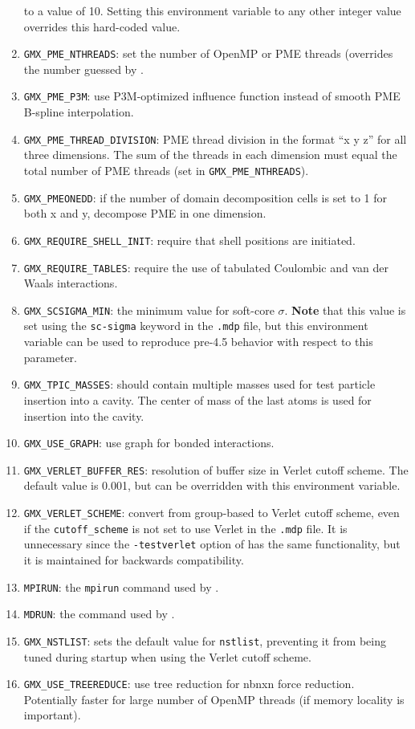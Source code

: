 \begin{enumerate}
        to a value of 10. Setting this environment variable to any other integer value overrides this hard-coded
        value.
\item   {\tt GMX_PME_NTHREADS}: set the number of OpenMP or PME threads (overrides the number guessed by 
        {\tt {}}.
\item   {\tt GMX_PME_P3M}: use P3M-optimized influence function instead of smooth PME B-spline interpolation.
\item   {\tt GMX_PME_THREAD_DIVISION}: PME thread division in the format ``x y z'' for all three dimensions. The
        sum of the threads in each dimension must equal the total number of PME threads (set in 
        {\tt GMX_PME_NTHREADS}).
\item   {\tt GMX_PMEONEDD}: if the number of domain decomposition cells is set to 1 for both x and y, 
        decompose PME in one dimension.
\item   {\tt GMX_REQUIRE_SHELL_INIT}: require that shell positions are initiated.
\item   {\tt GMX_REQUIRE_TABLES}: require the use of tabulated Coulombic
        and van der Waals interactions.
\item   {\tt GMX_SCSIGMA_MIN}: the minimum value for soft-core $\sigma$. {\bf Note} that this value is set
        using the {\tt sc-sigma} keyword in the {\tt .mdp} file, but this environment variable can be used
        to reproduce pre-4.5 behavior with respect to this parameter.
\item   {\tt GMX_TPIC_MASSES}: should contain multiple masses used for test particle insertion into a cavity.
        The center of mass of the last atoms is used for insertion into the cavity.
\item   {\tt GMX_USE_GRAPH}: use graph for bonded interactions.
\item   {\tt GMX_VERLET_BUFFER_RES}: resolution of buffer size in Verlet cutoff scheme.  The default value is
        0.001, but can be overridden with this environment variable.
\item   {\tt GMX_VERLET_SCHEME}: convert from group-based to Verlet cutoff scheme, even if the {\tt cutoff_scheme} is
        not set to use Verlet in the {\tt .mdp} file. It is unnecessary since the {\tt -testverlet} option of
        {\tt {}} has the same functionality, but it is maintained for backwards compatibility.
\item   {\tt MPIRUN}: the {\tt mpirun} command used by {\tt {}}.
\item   {\tt MDRUN}: the {\tt {}} command used by {\tt {}}.
\item   {\tt GMX_NSTLIST}: sets the default value for {\tt nstlist}, preventing it from being tuned during
        {\tt {}} startup when using the Verlet cutoff scheme.
\item   {\tt GMX_USE_TREEREDUCE}: use tree reduction for nbnxn force reduction. Potentially faster for large number of 
        OpenMP threads (if memory locality is important).

\end{enumerate}

